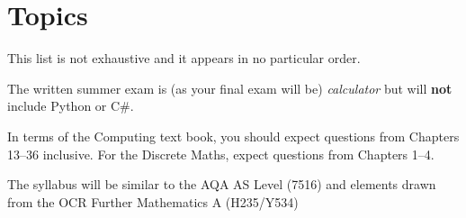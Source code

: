 \section*{Topics} %
\label{sec:topics}

This list is not exhaustive and it appears in no particular order.

The written summer exam is (as your final exam will be) \emph{calculator} but will \textbf{not} include Python or C\#. 

In terms of the Computing text book, you should expect questions from Chapters 13--36 inclusive. For the Discrete Maths, expect questions from Chapters 1--4. 

The syllabus will be similar to the AQA AS Level (7516)\cite{syllabus-7516} and elements drawn from the OCR Further Mathematics A (H235/Y534)\cite{syllabus-h245}  

